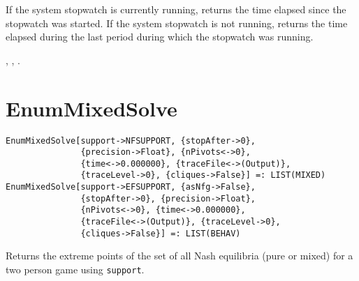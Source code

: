 \noindent
If the system stopwatch is currently running, returns the
time elapsed since the stopwatch was started.  If the system stopwatch
is not running, returns the time elapsed during the last period during which
the stopwatch was running.

\seealso {},
,
.


\section*{EnumMixedSolve}\label{PrimEnumMixedSolve}
\begin{verbatim}
EnumMixedSolve[support->NFSUPPORT, {stopAfter->0}, 
               {precision->Float}, {nPivots<->0}, 
               {time<->0.000000}, {traceFile<->(Output)}, 
               {traceLevel->0}, {cliques->False}] =: LIST(MIXED) 
EnumMixedSolve[support->EFSUPPORT, {asNfg->False}, 
               {stopAfter->0}, {precision->Float}, 
               {nPivots<->0}, {time<->0.000000}, 
               {traceFile<->(Output)}, {traceLevel->0},
               {cliques->False}] =: LIST(BEHAV) 
\end{verbatim}

\noindent
Returns the extreme points of the set of all Nash equilibria (pure or
mixed) for a two person game using \verb+support+.


